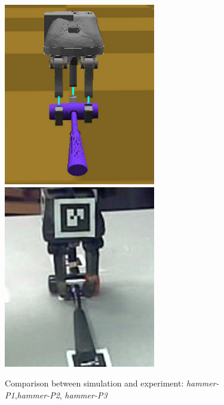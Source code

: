 \begin{figure}[!!hbt]
\begin{center}
{ \includegraphics[width=0.30\columnwidth]     {images/ssoch/fig/hammer_P3}    \label{hammer_P3}}
{ \includegraphics[width=0.30\columnwidth]     {images/ssoch/fig/hammer_p3_1}    \label{hammer_p3_1}}
        \caption{Comparison between simulation and experiment: \emph{hammer-P1},\emph{hammer-P2}, \emph{hammer-P3}}
        \label{hammer}
        \end{center}
\end{figure}


